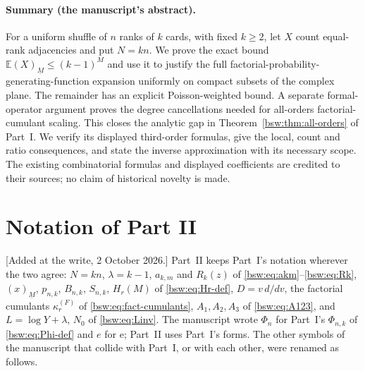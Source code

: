 \documentclass[11pt,letterpaper]{article}
\theoremstyle{definition}
\theoremstyle{remark}
\newcommand{\EE}{\mathbb E}
\newcommand{\ee}{\mathrm e}
\newcommand{\fall}[2]{(#1)_{\underline{#2}}}
\begin{document}
\paragraph{Summary (the manuscript's abstract).}
For a uniform shuffle of $n$ ranks of $k$ cards, with fixed $k\ge2$, let $X$
count equal-rank adjacencies and put $N=kn$.  We prove the exact bound
$\EE\fall{X}{M}\le(k-1)^M$ and use it to justify the full
factorial-probability-generating-function expansion uniformly on compact
subsets of the complex plane.  The remainder has an explicit
Poisson-weighted bound.  A separate formal-operator argument proves the
degree cancellations needed for all-orders factorial-cumulant scaling.  This
closes the analytic gap in Theorem~\ref{bsw:thm:all-orders} of Part~I.  We
verify its displayed third-order formulas, give the local, count and ratio
consequences, and state the inverse approximation with its necessary scope.
The existing combinatorial formulas and displayed coefficients are credited
to their sources; no claim of historical novelty is made.

\section{Notation of Part II}\label{bsw:rp:sec:notation}

[Added at the write, 2 October 2026.]  Part~II keeps Part~I's notation
wherever the two agree: $N=kn$, $\lambda=k-1$, $a_{k,m}$ and $R_k(z)$ of
\eqref{bsw:eq:akm}--\eqref{bsw:eq:Rk}, $\fall xM$, $p_{n,k}$, $B_{n,k}$,
$S_{n,k}$, $H_r(M)$ of \eqref{bsw:eq:Hr-def}, $D=v\,d/dv$, the factorial
cumulants $\kappa_r^{(F)}$ of \eqref{bsw:eq:fact-cumulants}, $A_1,A_2,A_3$
of \eqref{bsw:eq:A123}, and $L=\log Y+\lambda$, $N_0$ of
\eqref{bsw:eq:Linv}.  The manuscript wrote $\Phi_n$ for Part~I's
$\Phi_{n,k}$ of \eqref{bsw:eq:Phi-def} and $e$ for $\ee$; Part~II uses
Part~I's forms.  The other symbols of the manuscript that collide with
Part~I, or with each other, were renamed as follows.
\end{document}
